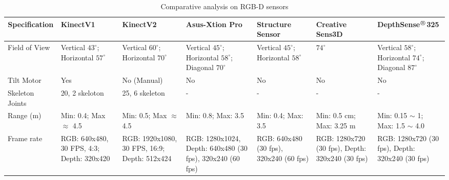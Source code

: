 \clearpage
\begin{landscape}
\Centering
\small
\begin{table}
\scriptsize
\caption{Comparative analysis on RGB-D sensors}
\label{table:rgbd_sensors}
\begin{tabularx}{600pt}{c*6{X}}
\toprule
  \textbf{Specification} & \textbf{KinectV1\footnotemark[1]} 
                         & \textbf{KinectV2\footnotemark[1]} 
                         & \textbf{Asus-Xtion Pro\footnotemark[2]} 
                         & \textbf{Structure Sensor\footnotemark[3]}
                         & \textbf{Creative Sens3D\footnotemark[4]} 
                         &  \textbf{DepthSense$^{\regmark}$325\footnotemark[5]} 
  \tabularnewline \midrule
  \multicolumn{1}{l}{Field of View}       & Vertical $43^{\circ}$; Horizontal $57^{\circ}$  
                                          & Vertical $60^{\circ}$; Horizontal $70^{\circ}$ 
                                          & Vertical $45^{\circ}$; Horizontal $58^{\circ}$; Diagonal $70^{\circ}$
                                          & Vertical $45^{\circ}$; Horizontal $58^{\circ}$ 
                                          & $74^{\circ}$
                                          & Vertical $58^{\circ}$; Horizontal $74^{\circ}$; Diagonal $87^{\circ}$
                                          \tabularnewline\midrule
                                          
  \multicolumn{1}{l}{Tilt Motor}          & Yes
  										 & No (Manual)
  										 & No 
  										 & No 
  										 & No
  										 & No 
  										 \tabularnewline\midrule
  \multicolumn{1}{l}{Skeleton Joints}     & 20, 2 skeloton
  										 & 25, 6 skeleton
  										 & - 
  										 & - 
  										 & - 
  										 & - 
  										 \tabularnewline\midrule			
  		 
  \multicolumn{1}{l}{Range (m)}           & Min: 0.4; Max $\approx$ 4.5 
  										 & Min: 0.5; Max $\approx$ 4.5
  										 & Min: 0.8; Max: 3.5
  										 & Min: 0.4; Max: 3.5  
  										 & Min: 0.5 cm; Max: 3.25 m 
  										 & Min: 0.15 $\sim$ 1; Max: 1.5 $\sim$ 4.0 
  										 \tabularnewline\midrule
  										 										 

  \multicolumn{1}{l}{Frame rate }         & RGB: 640x480, 30 FPS, 4:3; Depth: 320x420
  										 & RGB: 1920x1080, 30 FPS, 16:9; Depth: 512x424
  										 & RGB: 1280x1024, Depth: 640x480 (30 fps), 320x240 (60 fps)
  										 & RGB: 640x480 (30 fps), 320x240 (60 fps)
  										 & RGB: 1280x720 (30 fps), Depth: 320x240 (30 fps)
  										 & RGB: 1280x720 (30 fps), Depth: 320x240 (30 fps)
  										 \tabularnewline\midrule
  										 

\end{tabularx}
\end{table}
\end{landscape}

